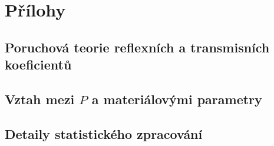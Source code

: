 \chapter{Přílohy}
  \section{Poruchová teorie reflexních a transmisních koeficientů}\label{k:dodatek vypocet}
  \section{Vztah mezi $P$ a materiálovými parametry}
  
  \section{Detaily statistického zpracování}
